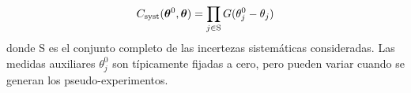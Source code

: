 \begin{equation}
  C_\text{syst} (\bm{\theta}^0, \bm{\theta}) = \prod_{j \in \text{S}} G(\theta_j^0 - \theta_j)
\end{equation}
%
donde S es el conjunto completo de las incertezas sistemáticas consideradas.
Las medidas auxiliares $\theta^0_j$ son típicamente fijadas a cero, pero pueden
variar cuando se generan los pseudo-experimentos.















